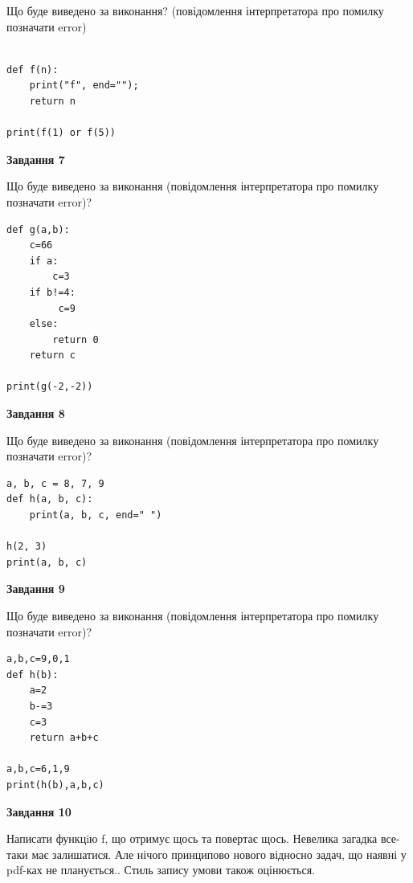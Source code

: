 \documentclass[12pt, ukrainian]{article}
\begin{document}
{\begin {large}
Що буде виведено за виконання? (повідомлення інтерпретатора про помилку позначати error)\par
\begin{verbatim}

def f(n):
    print("f", end="");
    return n

print(f(1) or f(5))
\end{verbatim}

{\begin {center}\textbf{Завдання 7}\end {center}}

Що буде виведено за виконання (повідомлення інтерпретатора про помилку позначати error)?\par
\begin{verbatim}
def g(a,b):
    c=66
    if a:
        c=3
    if b!=4:
         c=9
    else: 
        return 0
    return c

print(g(-2,-2))
\end{verbatim}

{\begin {center}\textbf{Завдання 8}\end {center}}

Що буде виведено за виконання (повідомлення інтерпретатора про помилку позначати error)?\par
\begin{verbatim}
a, b, c = 8, 7, 9
def h(a, b, c):
    print(a, b, c, end=" ")

h(2, 3)
print(a, b, c)
\end{verbatim}

{\begin {center}\textbf{Завдання 9}\end {center}}

Що буде виведено за виконання (повідомлення інтерпретатора про помилку позначати error)?\par
\begin{verbatim}
a,b,c=9,0,1
def h(b):
    a=2
    b-=3
    c=3
    return a+b+c

a,b,c=6,1,9
print(h(b),a,b,c)
\end{verbatim}

{\begin {center}\textbf{Завдання 10}\end {center}}


Написати функцiю f, що отримує щось та повертає щось. Невелика загадка все-таки має залишатися. Але нічого принципово нового відносно задач, що наявні у pdf-ках не планується.. Стиль запису умови також оцінюється.\par
\end {large}}
\newpage
\end{document}
